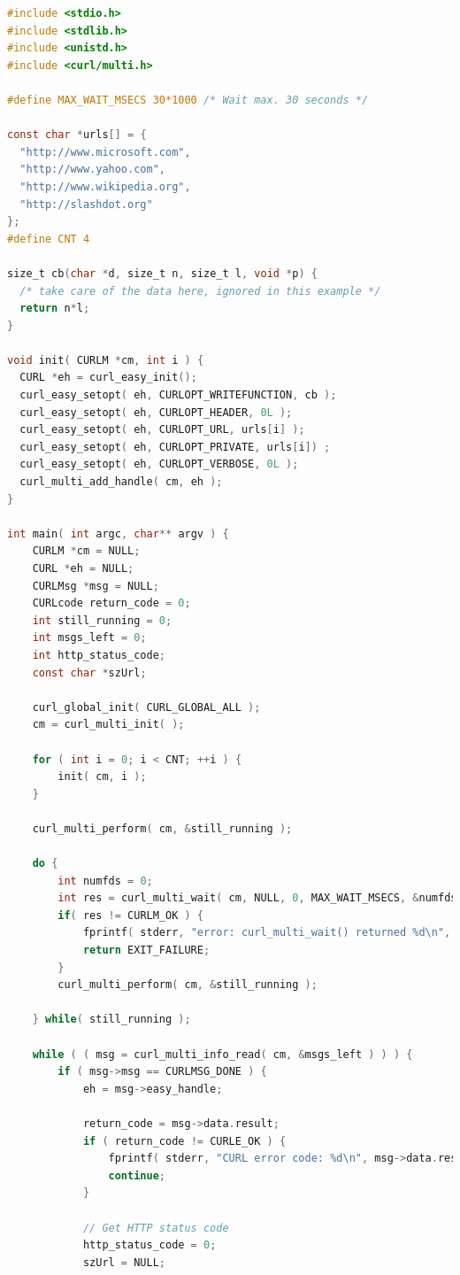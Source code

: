 \begin{lstlisting}[language=C]
#include <stdio.h>
#include <stdlib.h>
#include <unistd.h>
#include <curl/multi.h>

#define MAX_WAIT_MSECS 30*1000 /* Wait max. 30 seconds */

const char *urls[] = {
  "http://www.microsoft.com",
  "http://www.yahoo.com",
  "http://www.wikipedia.org",
  "http://slashdot.org"
};
#define CNT 4

size_t cb(char *d, size_t n, size_t l, void *p) {
  /* take care of the data here, ignored in this example */
  return n*l;
}

void init( CURLM *cm, int i ) {
  CURL *eh = curl_easy_init();
  curl_easy_setopt( eh, CURLOPT_WRITEFUNCTION, cb );
  curl_easy_setopt( eh, CURLOPT_HEADER, 0L );
  curl_easy_setopt( eh, CURLOPT_URL, urls[i] );
  curl_easy_setopt( eh, CURLOPT_PRIVATE, urls[i]) ;
  curl_easy_setopt( eh, CURLOPT_VERBOSE, 0L );
  curl_multi_add_handle( cm, eh );
}

int main( int argc, char** argv ) {
    CURLM *cm = NULL;
    CURL *eh = NULL;
    CURLMsg *msg = NULL;
    CURLcode return_code = 0;
    int still_running = 0; 
    int msgs_left = 0;
    int http_status_code;
    const char *szUrl;

    curl_global_init( CURL_GLOBAL_ALL );
    cm = curl_multi_init( );

    for ( int i = 0; i < CNT; ++i ) {
        init( cm, i );
    }

    curl_multi_perform( cm, &still_running );

    do {
        int numfds = 0;
        int res = curl_multi_wait( cm, NULL, 0, MAX_WAIT_MSECS, &numfds );
        if( res != CURLM_OK ) {
            fprintf( stderr, "error: curl_multi_wait() returned %d\n", res );
            return EXIT_FAILURE;
        }
        curl_multi_perform( cm, &still_running );

    } while( still_running );

    while ( ( msg = curl_multi_info_read( cm, &msgs_left ) ) ) {
        if ( msg->msg == CURLMSG_DONE ) {
            eh = msg->easy_handle;

            return_code = msg->data.result;
            if ( return_code != CURLE_OK ) {
                fprintf( stderr, "CURL error code: %d\n", msg->data.result );
                continue;
            }

            // Get HTTP status code
            http_status_code = 0;
            szUrl = NULL;


\end{lstlisting}
